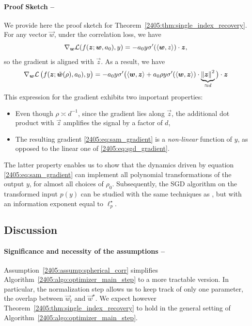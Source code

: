 \paragraph {Proof Sketch --} We provide here the proof sketch for Theorem~\ref{2405:thm:single_index_recovery}. For any vector $\vec{w}$, under the correlation loss, we have
\begin{equation}\label{2405:eq:sgd_gradient}
    \nabla_{{\boldsymbol{w}}} \mathcal{L}(f({\boldsymbol{z}}; {\boldsymbol{w}}, a_0), y) = -a_0 y \sigma'(\langle {\boldsymbol{w}}, z \rangle) \cdot {\boldsymbol{z}},
\end{equation}
so the gradient is aligned with $\vec{z}$. As a result, we have
\begin{equation}\label{2405:eq:sam_gradient}
    \nabla_{{\boldsymbol{w}}}\mathcal{L}\left(f({\boldsymbol{z}}; \tilde{{\boldsymbol{w}}}(\rho), a_0),  y \right) = -a_0 y \sigma'\big(\langle {\boldsymbol{w}}, {\boldsymbol{z}} \rangle + a_0 \rho y \sigma'(\langle {\boldsymbol{w}}, {\boldsymbol{z}} \rangle) \cdot \underbrace{\left\lVert {\boldsymbol{z}}\right\rVert^2}_{\approx d}\big) \cdot {\boldsymbol{z}}
\end{equation}
This expression for the gradient exhibits two important properties:
\begin{itemize}
    \item Even though $\rho \asymp d^{-1}$, since the gradient lies along $\vec{z}$, the additional dot product with $\vec{z}$ amplifies the signal by a factor of $d$,
    \item The resulting gradient  \eqref{2405:eq:sam_gradient} is a \emph{non-linear} function of $y$, as opposed to the linear one of \eqref{2405:eq:sgd_gradient}. 
\end{itemize}
The latter property enables us to show that the dynamics driven by equation \eqref{2405:eq:sam_gradient} can implement all polynomial transformations of the output $y$, for almost all choices of $\rho_0$. Subsequently, the SGD algorithm on the transformed input $p(y)$ can be studied with the same techniques as \cite{arous2021online}, but with an information exponent equal to $\ell_p^\star$.

\subsection{Discussion}\label{2405:subsec:single_index_discussion}

\paragraph{Significance and necessity of the assumptions --}
Assumption~\ref{2405:assump:spherical_corr} simplifies Algorithm~\ref{2405:algo:optimizer_main_step} to a more tractable version. In particular, the normalization step allows us to keep track of only one parameter, the overlap between $\vec{w}_t$ and $\vec{w}^\star$. We expect however Theorem~\ref{2405:thm:single_index_recovery} to hold in the general setting of Algorithm~\ref{2405:algo:optimizer_main_step}.

